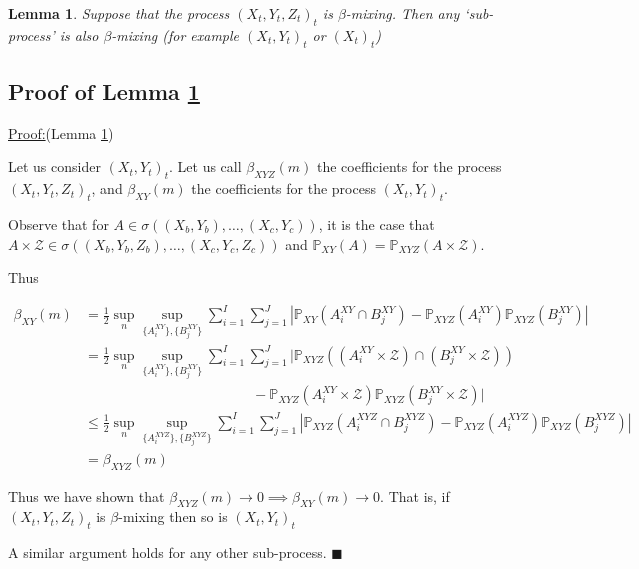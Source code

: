 \documentclass[]{article}
\newtheorem{lemma}{Lemma}
\newenvironment{claimproof}[1]{\par\noindent\underline{Proof:}\space#1}{\hfill $\blacksquare$}
\begin{document}
\begin{lemma}\label{lemma:beta}
Suppose that the process $(X_t,Y_t,Z_t)_t$ is $\beta$-mixing. Then any `sub-process' is also $\beta$-mixing (for example $(X_t,Y_t)_t$ or $(X_t)_t$)
\end{lemma}

\subsection{Proof of Lemma \ref{lemma:beta}}\label{supp:lemma-beta}

\begin{claimproof}(Lemma \ref{lemma:beta}) 

Let us consider $(X_t,Y_t)_t$.
Let us call $\beta_{XYZ}(m)$ the coefficients for the process $(X_t,Y_t,Z_t)_t$, and $\beta_{XY}(m)$ the coefficients for the process $(X_t,Y_t)_t$. 

Observe that for $A \in \sigma((X_b,Y_b),\ldots, (X_c,Y_c))$, it is the case that $A \times \mathcal{Z} \in \sigma((X_b,Y_b,Z_b),\ldots, (X_c,Y_c,Z_c))$ and $\mathbb{P}_{XY}(A) = \mathbb{P}_{XYZ}(A\times \mathcal{Z})$.

Thus

\begin{align*}
\beta_{XY}(m) &= \frac{1}{2} \sup_n \sup_{ \{A_i^{XY} \}, \{B_j^{XY} \} } \sum_{i=1}^I \sum_{j=1}^J | \mathbb{P}_{XY}(A_i^{XY} \cap B_j^{XY}) - \mathbb{P}_{XYZ}(A_i^{XY})\mathbb{P}_{XYZ}(B_j^{XY})| \\
&= \frac{1}{2} \sup_n \sup_{ \{A_i^{XY} \}, \{B_j^{XY} \} } \sum_{i=1}^I \sum_{j=1}^J | \mathbb{P}_{XYZ}((A_i^{XY}\times \mathcal{Z}) \cap (B_j^{XY} \times \mathcal{Z})) \\& \quad \quad\quad \quad \quad \quad\quad \quad \quad \quad\quad \quad- \mathbb{P}_{XYZ}(A_i^{XY}\times \mathcal{Z})\mathbb{P}_{XYZ}(B_j^{XY} \times \mathcal{Z})| \\
& \leq \frac{1}{2} \sup_n \sup_{ \{A_i^{XYZ} \}, \{B_j^{XYZ} \} } \sum_{i=1}^I \sum_{j=1}^J | \mathbb{P}_{XYZ}(A_i^{XYZ} \cap B_j^{XYZ}) - \mathbb{P}_{XYZ}(A_i^{XYZ})\mathbb{P}_{XYZ}(B_j^{XYZ})| \\
& = \beta_{XYZ}(m)
\end{align*}

Thus we have shown that  $\beta_{XYZ}(m) \longrightarrow 0 \implies \beta_{XY}(m) \longrightarrow 0$. That is, if  $(X_t,Y_t,Z_t)_t$ is $\beta$-mixing then so is  $(X_t,Y_t)_t$ 

A similar argument holds for any other sub-process.
\end{claimproof}
\end{document}
